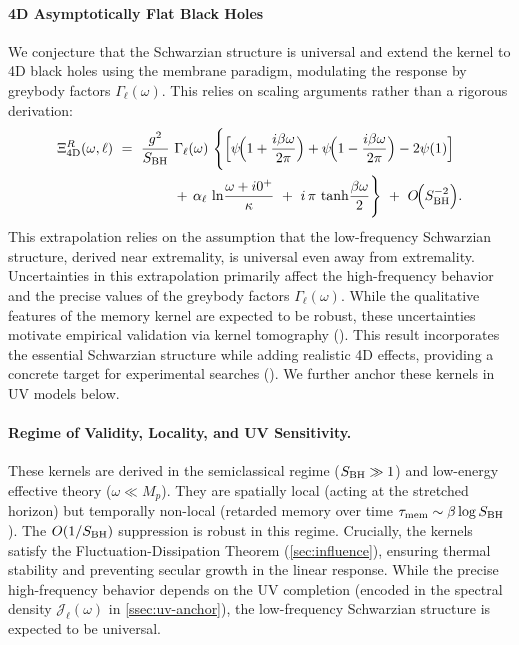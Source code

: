 \documentclass[a4paper,11pt]{article}
\theoremstyle{plain}
\theoremstyle{definition}
\theoremstyle{remark}
\begin{document}
\paragraph{4D Asymptotically Flat Black Holes} We conjecture that the Schwarzian structure is universal and extend the kernel to 4D black holes using the membrane paradigm, modulating the response by greybody factors $\Gamma_\ell(\omega)$. This relies on scaling arguments rather than a rigorous derivation:
\begin{align}
\Xi^R_{4\mathrm{D}}(\omega,\ell)\ &=\ \frac{g^2}{S_{\rm BH}}\ \Gamma_\ell(\omega)\ \Bigg\{\Big[\psi\!\Big(1+\frac{i\beta\omega}{2\pi}\Big)+\psi\!\Big(1-\frac{i\beta\omega}{2\pi}\Big)-2\psi(1)\Big] \nonumber\\
&\qquad\qquad +\, \alpha_\ell\,\ln\!\frac{\omega+i0^+}{\kappa}\ +\ i\,\pi\,\tanh\!\frac{\beta\omega}{2}\Bigg\}\ +\ O\!\Big(S_{\rm BH}^{-2}\Big).
\label{eq:kernel_4d}
\end{align}
This extrapolation relies on the assumption that the low-frequency Schwarzian structure, derived near extremality, is universal even away from extremality. Uncertainties in this extrapolation primarily affect the high-frequency behavior and the precise values of the greybody factors $\Gamma_\ell(\omega)$. While the qualitative features of the memory kernel are expected to be robust, these uncertainties motivate empirical validation via kernel tomography ().
This result incorporates the essential Schwarzian structure while adding realistic 4D effects, providing a concrete target for experimental searches (). We further anchor these kernels in UV models below.

\paragraph{Regime of Validity, Locality, and UV Sensitivity.}
These kernels are derived in the semiclassical regime ($S_{\rm BH} \gg 1$) and low-energy effective theory ($\omega \ll M_p$). They are spatially local (acting at the stretched horizon) but temporally non-local (retarded memory over time $\tau_{\rm mem} \sim \beta \log S_{\rm BH}$). The $O(1/S_{\rm BH})$ suppression is robust in this regime. Crucially, the kernels satisfy the Fluctuation-Dissipation Theorem (\cref{sec:influence}), ensuring thermal stability and preventing secular growth in the linear response. While the precise high-frequency behavior depends on the UV completion (encoded in the spectral density $\mathcal{J}_\ell(\omega)$ in \cref{ssec:uv-anchor}), the low-frequency Schwarzian structure is expected to be universal.
\end{document}
